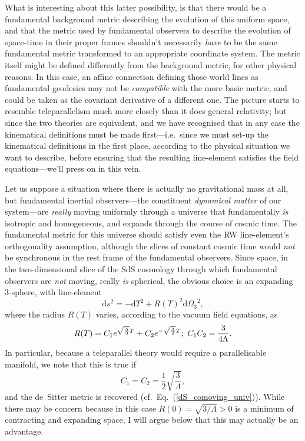 \documentclass[11pt]{article}
\begin{document}
\begin{appendix}
What is interesting about this latter possibility, is that there would be a fundamental background metric describing the evolution of this uniform space, and that the metric used by fundamental observers to describe the evolution of space-time in their proper frames shouldn't necessarily \textit{have} to be the same fundamental metric transformed to an appropriate coordinate system. The metric itself might be defined differently from the background metric, for other physical reasons. In this case, an affine connection defining those world lines as fundamental geodesics may not be \textit{compatible} with the more basic metric, and could be taken as the covariant derivative of a different one. The picture starts to resemble teleparallelism much more closely than it does general relativity; but since the two theories are equivalent, and we have recognised that in any case the kinematical definitions must be made first---i.e.\ since we must set-up the kinematical definitions in the first place, according to the physical situation we want to describe, before ensuring that the resulting line-element satisfies the field equations---we'll press on in this vein.

Let us suppose a situation where there is actually no gravitational mass at all, but fundamental inertial observers---the constituent \textit{dynamical matter} of our system---are \textit{really} moving uniformly through a universe that fundamentally \textit{is} isotropic and homogeneous, and expands through the course of cosmic time. The fundamental metric for this universe should satisfy even the RW line-element's orthogonality assumption, although the slices of constant cosmic time would \textit{not} be synchronous in the rest frame of the fundamental observers. Since space, in the two-dimensional slice of the SdS cosmology through which fundamental observers are \textit{not} moving, really \textit{is} spherical, the obvious choice is an expanding 3-sphere, with line-element
\begin{equation}
\mathrm{d}s^2=-\mathrm{d}T^2+R(T)^2{\mathrm{d}\Omega_3}^2,\label{3sphere}
\end{equation} 
where the radius $R(T)$ varies, according to the vacuum field equations, as
\begin{equation}
R(T) = C_1 e^{\sqrt{\Lambda \over 3}T}+C_2 e^{-\sqrt{\Lambda \over 3}T};\ C_1C_2=\frac{3}{4\Lambda}.
\end{equation}
In particular, because a teleparallel theory would require a parallelisable manifold, we note that this is true if
\begin{equation}
C_1=C_2=\frac{1}{2}\sqrt{\frac{3}{\Lambda}},
\end{equation}
and the de~Sitter metric is recovered (cf.~Eq.~(\ref{dS_comoving_univ})). While there may be concern because in this case $R(0)=\sqrt{3/\Lambda}>0$ is a minimum of contracting and expanding space, I will argue below that this may actually be an advantage.


\end{appendix}
\end{document}
